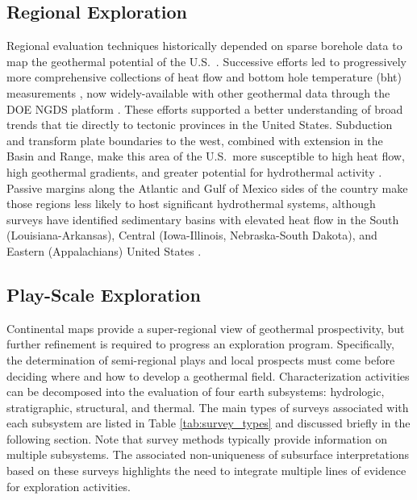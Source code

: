 \subsection{Regional Exploration}\label{ch2:regional_expl}
Regional evaluation techniques historically depended on sparse borehole data to map the geothermal potential of the U.S.\ \citep{kehle_aapg_1970}. Successive efforts led to progressively more comprehensive collections of heat flow and bottom hole temperature (\acrshort{bht}) measurements \citep{blackwell_heat_1990, blackwell_temperature-at-depth_2011, muffler_assessment_1979, sorey_low-temperature_1983, wisian_heat_1999}, now widely-available with other geothermal data through the DOE NGDS platform \citep{anderson_national_2013}. These efforts supported a better understanding of broad trends that tie directly to tectonic provinces in the United States. Subduction and transform plate boundaries to the west, combined with extension in the Basin and Range, make this area of the U.S.\ more susceptible to high heat flow, high geothermal gradients, and greater potential for hydrothermal activity \citep{mariner_low-temperature_1983}. Passive margins along the Atlantic and Gulf of Mexico sides of the country make those regions less likely to host significant hydrothermal systems, although surveys have identified sedimentary basins with elevated heat flow in the South (Louisiana-Arkansas), Central (Iowa-Illinois, Nebraska-South Dakota), and Eastern (Appalachians) United States \citep{blackwell_geothermal_1995, sorey_low-temperature_1983}.

\subsection{Play-Scale Exploration}\label{ch2:play_scale_expl}
Continental maps provide a super-regional view of geothermal prospectivity, but further refinement is required to progress an exploration program. Specifically, the determination of semi-regional plays and local prospects must come before deciding where and how to develop a geothermal field. Characterization activities can be decomposed into the evaluation of four earth subsystems: hydrologic, stratigraphic, structural, and thermal. The main types of surveys associated with each subsystem are listed in Table \ref{tab:survey_types} and discussed briefly in the following section. Note that survey methods typically provide information on multiple subsystems. The associated non-uniqueness of subsurface interpretations based on these surveys highlights the need to integrate multiple lines of evidence for exploration activities. 

